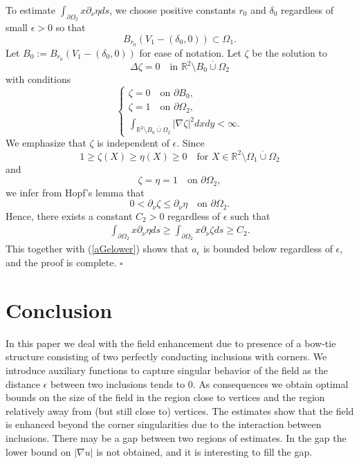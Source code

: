 \documentclass[11pt,a4paper]{article}
\numberwithin{equation}{section}
\newcommand{\qed}{\hfill \ensuremath{\square}}
\newcommand{\ds}{\displaystyle}
\newcommand{\p}{\partial}
\newcommand{\eqnref}[1]{(\ref {#1})}
\newcommand{\Rbb}{\mathbb{R}}
\newcommand{\Gd}{\delta}
\newcommand{\Ge}{\epsilon}
\newcommand{\Gn}{\eta}
\newcommand{\Gz}{\zeta}
\newcommand{\GD}{\Delta}
\newcommand{\GO}{\Omega}
\begin{document}
To estimate $\int_{\p \GO_2} x \p_{\nu} \eta ds$, we choose positive constants $r_0$ and $\Gd_0$ regardless of small $\Ge>0$ so that
$$
B_{r_0} (V_1-(\Gd_0,0)) \subset \GO_1 .
$$
Let $B_0:= B_{r_0} (V_1-(\Gd_0,0))$ for ease of notation. Let $\Gz$ be the solution to
$$
\GD \Gz = 0 \quad\mbox{in }  \Rbb^2 \setminus \overline{B_{0}\cup \GO_2}
$$
with conditions
$$
\begin{cases}
\ds \Gz = 0  \quad\mbox{on } \p B_{0} ,  \\
\ds \Gz = 1  \quad\mbox{on } \p \GO_{2}  ,\\
\ds \int_{\Rbb^2 \setminus \overline {B_{0}\cup \GO_2}} |\nabla \Gz|^2 dxdy < \infty .
\end{cases}
$$
We emphasize that $\Gz$ is independent of $\Ge$. Since
$$
1 \geq \Gz(X) \geq \Gn(X) \geq 0 \quad\mbox{for } X \in \Rbb^2 \setminus \overline{\GO_1 \cup \GO_2}
$$
and
$$
\Gz= \Gn = 1 \quad\mbox{on }\p \GO_2,
$$
we infer from Hopf's lemma that
$$
0 < \p_{\nu} \Gz \leq \p_{\nu} \Gn \quad\mbox{on }\p \GO_2.
$$
Hence, there exists a constant $C_2>0$ regardless of $\Ge$ such that
\begin{align*}
\int_{\p \GO_2} x \p_{\nu} \Gn ds \geq \int_{\p \GO_2} x  \p_{\nu} \Gz ds \geq C_2.
\end{align*}
This together with \eqnref{aGelower} shows that $a_\Ge$ is bounded below regardless of $\Ge$, and the proof is complete.
\qed

\section*{Conclusion}

In this paper we deal with the field enhancement due to presence of a bow-tie structure consisting of two perfectly conducting inclusions with corners. We introduce auxiliary functions to capture singular behavior of the field as the distance $\Ge$ between two inclusions tends to $0$. As consequences we obtain optimal bounds on the size of the field in the region close to vertices and the region relatively away from (but still close to) vertices. The estimates show that the field is enhanced beyond the corner singularities due to the interaction between inclusions. There may be a gap between two regions of estimates. In the gap the lower bound on $|\nabla u|$ is not obtained, and it is interesting to fill the gap.  

\end{document}
